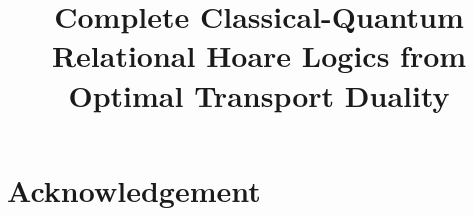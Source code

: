 \documentclass[acmsmall]{acmart}
\title{Complete Classical-Quantum Relational Hoare Logics from Optimal Transport Duality}
\begin{document}
\maketitle





















\section*{Acknowledgement}

\newpage 



\clearpage
\appendix


\end{document}
